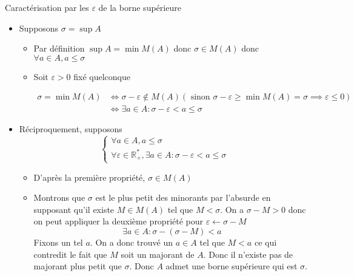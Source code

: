 \documentclass{article}
\renewenvironment{question_kholle}[2][ ]
{
	\subsection{\texorpdfstring{#2}{}}
	\notblank{#1}
	{
		\noindent #1
		\bigbreak
	}
	{}
	\begin{proof}
}
{
	\end{proof}
}
\begin{document}
\begin{question_kholle}[{
				Soit $A \in \mathcal{P}(\mathbb{R})$ une partie non vide et majorée.
				Soit $\sigma \in \mathbb{R}$
				$$
					\sigma = \sup A \iff \left\{ \begin{array}{ll}
						\forall a \in A, a \leqslant \sigma \\
						\forall \varepsilon \in \mathbb{R}_{+}^{*}, \exists a \in A : \sigma - \varepsilon < a \leqslant \sigma
					\end{array}\right.
				$$
			}]{Caractérisation par les $\varepsilon$ de la borne supérieure}

	\begin{itemize}[label = $\star$]
		\item Supposons $\sigma = \sup A$
		      \begin{itemize}[label = $\bullet$]
			      \item Par définition $\sup A = \min M(A)$ donc $\sigma \in M(A)$ donc $\forall a \in A, a \leqslant \sigma$

			      \item Soit $\varepsilon >0$ fixé quelconque

			            \begin{align*}
				            \sigma = \min M(A) & \iff \sigma - \varepsilon \not\in M(A) (\text{ sinon } \sigma - \varepsilon \geqslant \min M(A)= \sigma \implies \varepsilon \leqslant 0) \\
				                               & \iff \exists a \in A: \sigma - \varepsilon < a \leqslant \sigma
			            \end{align*}

		      \end{itemize}

		\item Réciproquement, supposons
		      $$
			      \left\{ \begin{array}{ll}
				      \forall a \in A, a \leqslant \sigma \\
				      \forall \varepsilon \in \mathbb{R}_{+}^{*}, \exists a \in A : \sigma - \varepsilon < a \leqslant \sigma
			      \end{array}\right.
		      $$
		      \begin{itemize}[label = $\bullet$]
			      \item D'après la première propriété, $\sigma \in M(A)$
			      \item Montrons que $\sigma$ est le plus petit des minorants par l'absurde en supposant qu'il existe $M \in M(A)$ tel que $M < \sigma$.
			            On a $\sigma - M >0$ donc on peut appliquer la deuxième propriété pour $\varepsilon \leftarrow \sigma - M$
			            $$
				            \exists a \in A : \sigma - (\sigma - M )<a
			            $$
			            Fixons un tel $a$.
			            On a donc trouvé un $a \in A$ tel que $M < a$ ce qui contredit le fait que $M$ soit un majorant de $A$.
			            Donc il n'existe pas de majorant plus petit que $\sigma$.
			            Donc $A$ admet une borne supérieure qui est $\sigma$.
		      \end{itemize}
	\end{itemize}
\end{question_kholle}
\end{document}
